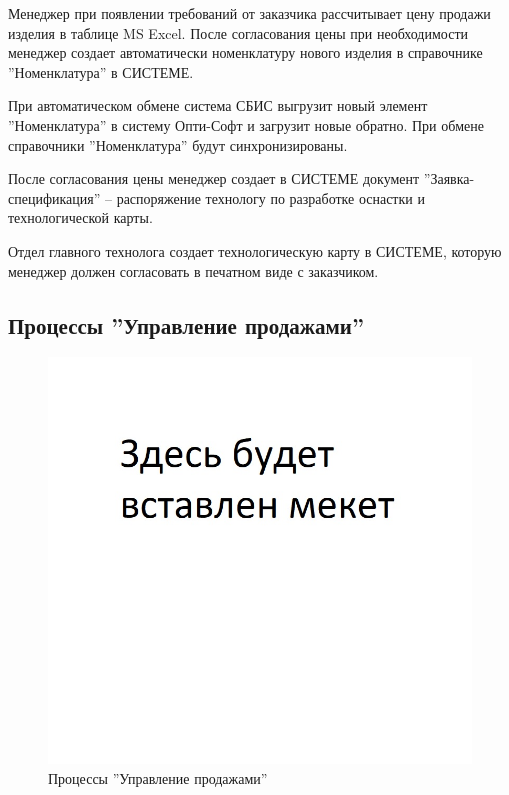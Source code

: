Менеджер при появлении требований от заказчика рассчитывает цену продажи изделия в таблице MS Excel. После согласования цены при необходимости менеджер создает автоматически номенклатуру нового изделия в справочнике ''Номенклатура'' в СИСТЕМЕ. 

При автоматическом обмене система СБИС выгрузит новый элемент ''Номенклатура'' в систему Опти-Софт и загрузит новые обратно. При обмене справочники ''Номенклатура'' будут синхронизированы. 


После согласования цены менеджер создает в СИСТЕМЕ документ ''Заявка-спецификация'' -- распоряжение технологу по разработке оснастки и технологической карты. 

Отдел главного технолога создает технологическую карту в СИСТЕМЕ, которую менеджер должен согласовать в печатном виде с заказчиком. 



\subsection{Процессы ''Управление продажами''}
\begin{figure}
\begin{center}
  \includegraphics[angle=90, height=0.9\textheight, keepaspectratio]{Pics/Pattern.jpg}
\end{center}
  \caption{Процессы ''Управление продажами''}
  \label{pic:Schema_2}
\end{figure}
\clearpage




